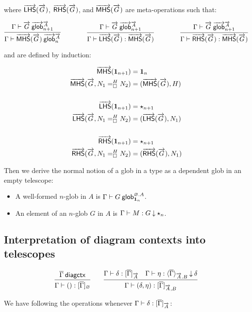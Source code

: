 where $\lhs{\tel G}$, $\rhs{\tel G}$, and $\mhs{\tel G}$ are meta-operations
such that:

\[
\infer
  {\wfglob{\Gamma}{\mhs{\tel G}}{\tel A}n}
  {\wfglob{\Gamma}{\tel G}{\tel A}{n+1}}
\qquad\qquad
\infer
  {\ofglob{\Gamma}{\lhs{\tel G}}{\mhs{\tel G}}}
  {\wfglob{\Gamma}{\tel G}{\tel A}{n+1}}
\qquad\qquad
\infer
  {\ofglob{\Gamma}{\rhs{\tel G}}{\mhs{\tel G}}}
  {\wfglob{\Gamma}{\tel G}{\tel A}{n+1}}
\]

and are defined by induction:

\[\begin{aligned}
\mhs{\unitglob{n+1}} &= \unitglob n \\
\mhs{\tel G,\dhomj{H}{N_1}{N_2}{\blank}} &= (\mhs{\tel G},H) \\
&\\
\lhs{\unitglob{n+1}} &= \unitglobelt{n+1} \\
\lhs{\tel G,\dhomj{H}{N_1}{N_2}{\blank}} &= (\lhs{\tel G},N_1) \\
&\\
\rhs{\unitglob{n+1}} &= \unitglobelt{n+1} \\
\rhs{\tel G,\dhomj{H}{N_1}{N_2}{\blank}} &= (\rhs{\tel G},N_1)
\end{aligned}\]

Then we derive the normal notion of a glob in a type as a dependent glob in an
empty telescope:
\begin{itemize}
\item A well-formed $n$-glob in $A$ is
$\wfdepglob{\Gamma}{G}{\emptyctx.A}{\unitglob n}$.
\item An element of an $n$-glob $G$ in $A$ is
$\ofdepglob{\Gamma}{M}{G}{\unitglobelt n}$.
\end{itemize}

\subsection{Interpretation of diagram contexts into telescopes}

\begin{small}
\[\infer
    {\ofinterp{\Gamma}{()}{\diag\Gamma}{\emptytel}}
    {\wfdiagctx{\diag\Gamma}}
  \qquad
  \infer
    {\ofinterp{\Gamma}{(\delta,\eta)}{\diag\Gamma}{\tel A,B}}
    {\ofinterp{\Gamma}{\delta}{\diag\Gamma}{\tel A}
    &\ofinterpdep{\Gamma}{\eta}{\diag\Gamma}{\tel A.B}{\delta}}
\]
\end{small}

We have following the operations whenever
$\ofinterp{\Gamma}{\delta}{\diag\Gamma}{\tel A}$:

